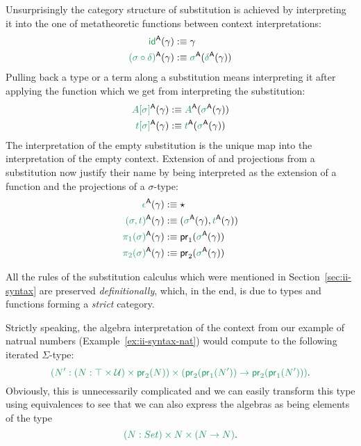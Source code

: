 \begin{defn}
Unsurprisingly the category structure of substitution is achieved by interpreting
it into the one of metatheoretic functions between context interpretations:
\begin{align*}
\grm{\id}^\CC(\gamma)			&:\equiv \gamma \\
\grm{(\sigma \circ \delta)}^\CC(\gamma)	&:\equiv \grm{\sigma}^\CC(\grm{\delta}^\CC(\gamma))
\end{align*}
Pulling back a type or a term along a substitution means interpreting it after
applying the function which we get from interpreting the substitution:
\begin{align*}
\grm{A[\sigma]}^\CC(\gamma)		&:\equiv \grm{A}^\CC(\grm{\sigma}^\CC(\gamma)) \\
\grm{t[\sigma]}^\CC(\gamma)		&:\equiv \grm{t}^\CC(\grm{\sigma}^\CC(\gamma))
\end{align*}
The interpretation of the empty substitution is the unique map into the interpretation
of the empty context.
Extension of and projections from a substitution now justify their name by being
interpreted as the extension of a function and the projections of a $\sigma$-type:
\begin{align*}
\grm{\epsilon}^\CC(\gamma)		&:\equiv \star \\
\grm{(\sigma, t)}^\CC(\gamma)		&:\equiv (\grm{\sigma}^\CC(\gamma), \grm{t}^\CC(\gamma)) \\
\grm{\pi_1(\sigma)}^\CC(\gamma)		&:\equiv \pr_1(\grm{\sigma}^\CC(\gamma)) \\
\grm{\pi_2(\sigma)}^\CC(\gamma)		&:\equiv \pr_2(\grm{\sigma}^\CC(\gamma))
\end{align*}

All the rules of the substitution calculus which were mentioned in Section~\ref{sec:ii-syntax}
are preserved \emph{definitionally}, which, in the end, is due to types and
functions forming a \emph{strict} category. %


\end{defn}

\begin{example}
Strictly speaking, the algebra interpretation of the
context from our example of natrual numbers (Example~\ref{ex:ii-syntax-nat})
would compute to the following iterated $\Sigma$-type:
\begin{equation*}
\grm{\left(N' : (N : \top \times \UU) \times \pr_2(N)\right)
  \times \left(\pr_2(\pr_1(N')) \to \pr_2(\pr_1(N')) \right) } \text{.}
\end{equation*}
Obviously, this is unnecessarily complicated and we can easily transform this
type using equivalences to see that we can also express the algebras as being
elements of the type
\begin{equation*}
\grm{(N : Set) \times N \times (N \to N)} \text{.}
\end{equation*}
\end{example}

